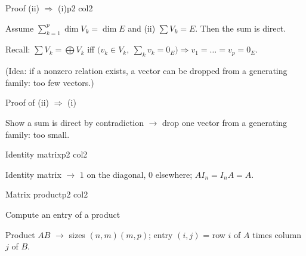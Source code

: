 \documentclass[sheet,noautoquant,noautokw]{neyvia-study}
\begin{document}
\begin{concept}[1.46]{Proof (ii) $\Rightarrow$ (i)}{p2 col2}
\begin{definition}
\noindent Assume $\sum_{k=1}^p\dim V_k=\dim E$ and (ii) $\sum V_k=E$. Then the sum is direct.
\par\noindent Recall: $\sum V_k=\bigoplus V_k$ iff $\big(v_k\in V_k,\ \sum_kv_k=0_E\big)\Rightarrow v_1=\dots=v_p=0_E$.
\par\noindent (Idea: if a nonzero relation exists, a vector can be dropped from a generating family: too few vectors.)
\end{definition}
\begin{method}{Proof of (ii) $\Rightarrow$ (i)}
\end{method}
\begin{reflex}
Show a sum is direct by contradiction \ensuremath{\rightarrow} drop one vector from a generating family: too small.
\end{reflex}
\end{concept}
\begin{concept}[1.47]{Identity matrix}{p2 col2}
\begin{definition}
\end{definition}
\begin{reflex}
Identity matrix \ensuremath{\rightarrow} $1$ on the diagonal, $0$ elsewhere; $AI_n=I_nA=A$.
\end{reflex}
\end{concept}
\begin{concept}[1.48]{Matrix product}{p2 col2}
\begin{definition}
\end{definition}
\begin{method}{Compute an entry of a product}
\end{method}
\begin{reflex}
Product $AB$ \ensuremath{\rightarrow} sizes $(n,m)(m,p)$; entry $(i,j)$ = row $i$ of $A$ times column $j$ of $B$.
\end{reflex}
\end{concept}
\end{document}
